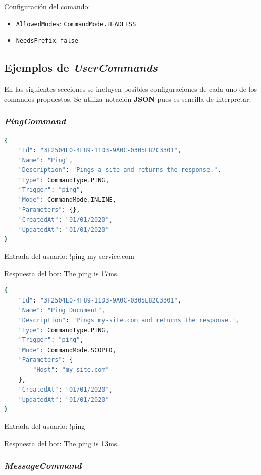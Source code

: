Configuración del comando:

\begin{itemize}
	\item \verb|AllowedModes|: \verb|CommandMode.HEADLESS|
	\item \verb|NeedsPrefix|: \verb|false|
\end{itemize}


\subsection{Ejemplos de \textit{UserCommands}}

En las siguientes secciones se incluyen posibles configuraciones de cada uno de los comandos propuestos. Se utiliza notación \textbf{JSON} pues es sencilla de interpretar.

\subsubsection{\textit{PingCommand}}

\begin{lstlisting}[language=sh]
{
    "Id": "3F2504E0-4F89-11D3-9A0C-0305E82C3301",
    "Name": "Ping",
    "Description": "Pings a site and returns the response.",
    "Type": CommandType.PING,
    "Trigger": "ping",
    "Mode": CommandMode.INLINE,
    "Parameters": {},
    "CreatedAt": "01/01/2020",
    "UpdatedAt": "01/01/2020"
}
\end{lstlisting}

Entrada del usuario: !ping my-service.com

Respuesta del bot: The ping is 17ms.

\begin{lstlisting}[language=sh]
{
    "Id": "3F2504E0-4F89-11D3-9A0C-0305E82C3301",
    "Name": "Ping Document",
    "Description": "Pings my-site.com and returns the response.",    
    "Type": CommandType.PING,
    "Trigger": "ping",
    "Mode": CommandMode.SCOPED,
    "Parameters": {
        "Host": "my-site.com"
    },
    "CreatedAt": "01/01/2020",
    "UpdatedAt": "01/01/2020"
}
\end{lstlisting}

Entrada del usuario: !ping

Respuesta del bot: The ping is 13ms.



\subsubsection{\textit{MessageCommand}}


